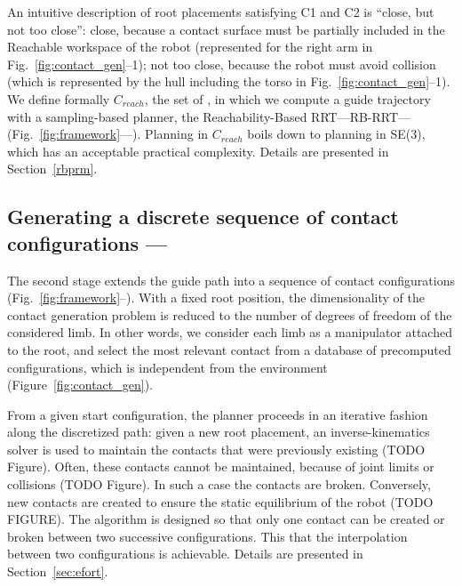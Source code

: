 An intuitive description of root placements satisfying C1 and C2 is ``close, but not too close'': close, because a contact surface must be partially included in the Reachable workspace of the robot (represented for the right arm in Fig.~\ref{fig:contact_gen}--1); not too close, because the robot must avoid collision (which is represented by the hull including the torso in Fig.~\ref{fig:contact_gen}--1). We define formally $C_{reach}$, the set of , in which we compute a guide trajectory with a sampling-based planner, the Reachability-Based RRT---RB-RRT--- (Fig.~\ref{fig:framework}---\Pa). Planning in $C_{reach}$ boils down to planning in SE(3), which has an acceptable practical complexity.
%
Details are presented in Section~\ref{rbprm}.

\subsection{Generating a discrete sequence of contact configurations --- \Pb}

The second stage extends the guide path into a sequence of contact configurations (Fig.~\ref{fig:framework}--\Pb). 
With a fixed root position, the dimensionality of the 
contact generation problem is reduced to the number of degrees of freedom of the considered limb. In other words, we consider each limb as a manipulator attached to the root, and select the most relevant contact from a database of precomputed configurations, which is independent from the environment (Figure~\ref{fig:contact_gen}).

From a given start configuration, the planner proceeds in an iterative fashion along the discretized path: given a new root placement, an inverse-kinematics solver 
is used to maintain the contacts that were previously existing (TODO Figure). Often, these contacts cannot be maintained, because of joint limits or collisions (TODO Figure).
In such a case the contacts are broken. Conversely, new contacts are created to ensure the static equilibrium of the robot (TODO FIGURE).
The algorithm is designed so that only one contact can be created or broken between two successive configurations. This  that the interpolation between two configurations is achievable.
Details are presented in Section~\ref{sec:efort}. 

